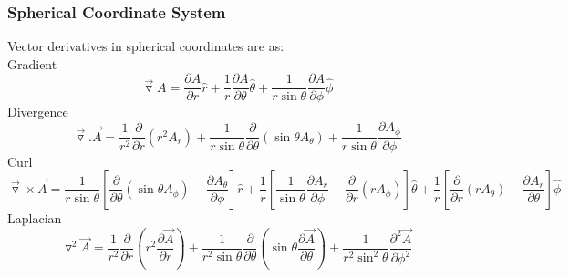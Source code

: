 \documentclass[a4paper, twoside] {thesis}
\begin{document}
\subsubsection{Spherical Coordinate System}
Vector derivatives in spherical coordinates are as:\\
Gradient\\
\begin{equation}
\vec{\triangledown} A = \frac{\partial A}{\partial r}\hat{r}+\frac{1}{r}\frac{\partial A}{\partial \theta}\hat{\theta}+\frac{1}{r\sin\theta}\frac{\partial A}{\partial \phi}\hat{\phi}
\end{equation}
Divergence\\
\begin{equation}
\vec{\triangledown}.\vec{A} = \frac{1}{r^2}\frac{\partial}{\partial r}(r^2A_r)+\frac{1}{r\sin\theta}\frac{\partial}{\partial\theta}(\sin\theta A_\theta)+\frac{1}{r\sin\theta}\frac{\partial A_\phi}{\partial\phi}
\end{equation}
Curl\\
\begin{equation}
\vec{\triangledown}\times\vec{A} = \frac{1}{r\sin\theta}[\frac{\partial}{\partial\theta}(\sin\theta A_\phi)-\frac{\partial A_\theta}{\partial\phi}]\hat{r}+\frac{1}{r}[\frac{1}{\sin\theta}\frac{\partial A_r}{\partial\phi}-\frac{\partial}{\partial r}(rA_\phi)]\hat{\theta}+\frac{1}{r}[\frac{\partial}{\partial r}(rA_\theta)-\frac{\partial A_r}{\partial \theta}]\hat{\phi}
\end{equation}
Laplacian\\
\begin{equation}
\triangledown^2 \vec{A} = \frac{1}{r^2}\frac{\partial}{\partial r}(r^2\frac{\partial\vec{A}}{\partial r})+\frac{1}{r^2\sin\theta}\frac{\partial}{\partial\theta}(\sin\theta\frac{\partial\vec{A}}{\partial \theta})+\frac{1}{r^2\sin^2\theta}\frac{\partial^2\vec{A}}{\partial \phi^2}
\end{equation}
\end{document}
